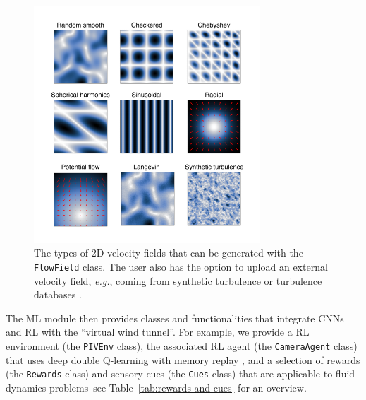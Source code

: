 \documentclass[a4paper,fleqn]{cas-dc}
\begin{document}
\begin{figure}[t]
\centering
\includegraphics[width=8.5cm]{velocity-fields.pdf}
\caption{The types of 2D velocity fields that can be generated with the \texttt{FlowField} class. The user also has the option to upload an external velocity field, \textit{e.g.}, coming from synthetic turbulence \citep{saad2017scalable, richards2018fast} or turbulence databases \cite{perlman2007data}.}
\label{fig:velocity-fields}
\end{figure}

The ML module then provides classes and functionalities that integrate CNNs and RL with the ``virtual wind tunnel''. For example, we provide a RL environment (the \texttt{PIVEnv} class), the associated RL agent (the \texttt{CameraAgent} class) that uses deep double Q-learning \cite{van2016deep} with memory replay \cite{liu2018effects}, and a selection of rewards (the \texttt{Rewards} class) and sensory cues (the \texttt{Cues} class) that are applicable to fluid dynamics problems--see Table~\ref{tab:rewards-and-cues} for an overview.
\end{document}
